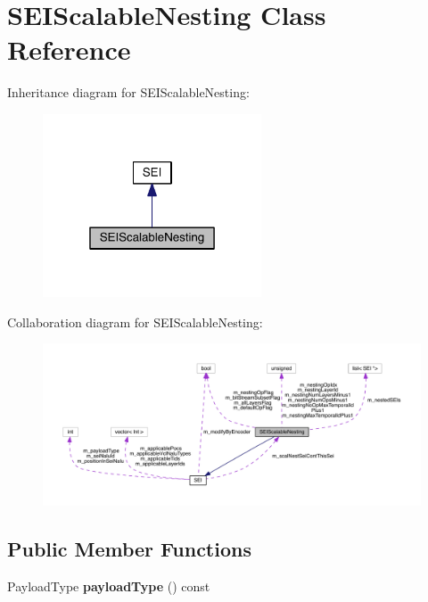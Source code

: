 \hypertarget{class_s_e_i_scalable_nesting}{}\section{S\+E\+I\+Scalable\+Nesting Class Reference}
\label{class_s_e_i_scalable_nesting}


Inheritance diagram for S\+E\+I\+Scalable\+Nesting\+:
\nopagebreak
\begin{figure}[H]
\begin{center}
\leavevmode
\includegraphics[width=184pt]{d1/dbf/class_s_e_i_scalable_nesting__inherit__graph}
\end{center}
\end{figure}


Collaboration diagram for S\+E\+I\+Scalable\+Nesting\+:
\nopagebreak
\begin{figure}[H]
\begin{center}
\leavevmode
\includegraphics[width=350pt]{d3/d19/class_s_e_i_scalable_nesting__coll__graph}
\end{center}
\end{figure}
\subsection*{Public Member Functions}
\begin{DoxyCompactItemize}
\item 
\mbox{\label{class_s_e_i_scalable_nesting_ae88af08667323563d5adaa131bcb12ee}} 
Payload\+Type {\bfseries payload\+Type} () const
\end{DoxyCompactItemize}

